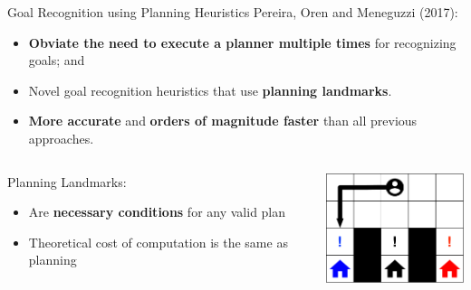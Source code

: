 \documentclass[usenames,dvipsnames]{beamer}
\begin{document}
\begin{frame}[c]{Goal Recognition using Planning Heuristics}
	Pereira, Oren and Meneguzzi (2017):
   	\begin{itemize}
		\item \textbf{Obviate the need to execute a planner multiple times} for recognizing goals; and
		\item Novel goal recognition heuristics that use \textbf{planning landmarks}.
		\item \textbf{More accurate} and \textbf{orders of magnitude faster} than all previous approaches.
	\end{itemize}
	\begin{columns}
		\begin{column}{.5\textwidth}
			Planning Landmarks:
			\begin{itemize}
				\item Are \textbf{necessary conditions} for any valid plan
				\item Theoretical cost of computation is the same as planning
			\end{itemize}
		\end{column}
		\begin{column}{.5\textwidth}
			\begin{center}
				\includegraphics[width=12em]{fig/gr-approaches/gr-landmarks.pdf}
			\end{center}
		\end{column}
	\end{columns}
\end{frame}
\end{document}
